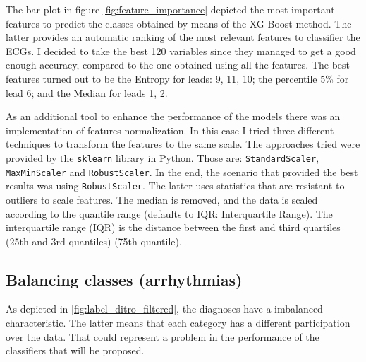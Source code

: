 The bar-plot in figure \ref{fig:feature_importance} depicted the most important features to predict the classes obtained by means of the XG-Boost method. The latter provides an automatic ranking of the most relevant features to classifier the ECGs. I decided to take the best 120 variables since they managed to get a good enough accuracy, compared to the one obtained using all the features. The best features turned out to be the Entropy for leads: 9, 11, 10; the percentile 5\% for lead 6; and the Median for leads 1, 2.

As an additional tool to enhance the performance of the models there was an implementation of features normalization. In this case I tried three different techniques to transform the features to the same scale. The approaches tried were provided by the \texttt{sklearn} library in Python. Those are: \texttt{StandardScaler}, \texttt{MaxMinScaler} and \texttt{RobustScaler}. In the end, the scenario that provided the best results was using \texttt{RobustScaler}. The latter uses statistics that are resistant to outliers to scale features. The median is removed, and the data is scaled according to the quantile range (defaults to IQR: Interquartile Range). The interquartile range (IQR) is the distance between the first and third quartiles (25th and 3rd quantiles) (75th quantile).

\subsection{Balancing classes (arrhythmias)}

As depicted in \ref{fig:label_ditro_filtered}, the diagnoses have a imbalanced characteristic. The latter means that each category has a different participation over the data. That could represent a problem in the performance of the classifiers that will be proposed.

